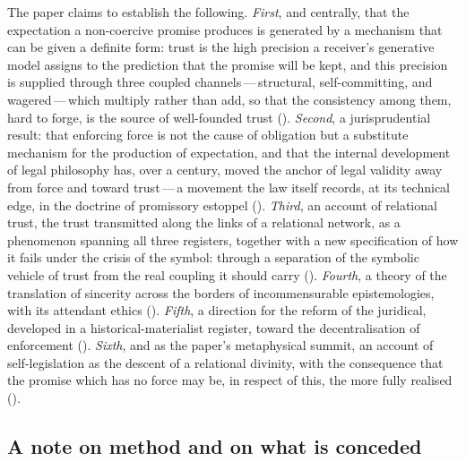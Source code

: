 The paper claims to establish the following. \emph{First}, and centrally, that the expectation a non-coercive promise produces is generated by a mechanism that can be given a definite form: trust is the high precision a receiver's generative model assigns to the prediction that the promise will be kept, and this precision is supplied through three coupled channels\,---\,structural, self-committing, and wagered\,---\,which multiply rather than add, so that the consistency among them, hard to forge, is the source of well-founded trust (). \emph{Second}, a jurisprudential result: that enforcing force is not the cause of obligation but a substitute mechanism for the production of expectation, and that the internal development of legal philosophy has, over a century, moved the anchor of legal validity away from force and toward trust\,---\,a movement the law itself records, at its technical edge, in the doctrine of promissory estoppel (). \emph{Third}, an account of relational trust, the trust transmitted along the links of a relational network, as a phenomenon spanning all three registers, together with a new specification of how it fails under the crisis of the symbol: through a separation of the symbolic vehicle of trust from the real coupling it should carry (). \emph{Fourth}, a theory of the translation of sincerity across the borders of incommensurable epistemologies, with its attendant ethics (). \emph{Fifth}, a direction for the reform of the juridical, developed in a historical-materialist register, toward the decentralisation of enforcement (). \emph{Sixth}, and as the paper's metaphysical summit, an account of self-legislation as the descent of a relational divinity, with the consequence that the promise which has no force may be, in respect of this, the more fully realised ().

\subsection*{A note on method and on what is conceded}

